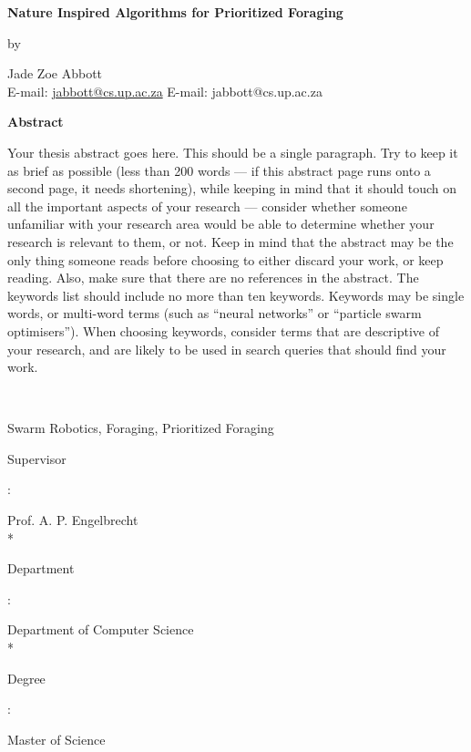 
\newpage

\begin{center}
	{\large\bf Nature Inspired Algorithms for Prioritized Foraging}
\end{center}
\begin{center}by\end{center}
\begin{center}
	{Jade Zoe Abbott}\\
	\ifpdf
		E-mail: \href{mailto:jabbott@cs.up.ac.za}{jabbott@cs.up.ac.za}
	\else
		E-mail: jabbott@cs.up.ac.za
	\fi
\end{center}
\vspace{1cm}
\begin{center}{\large\bf Abstract}\end{center}
Your thesis abstract goes here. This should be a single paragraph. Try to keep it as brief as possible (less than 200 words --- if this abstract page runs onto a second page, it needs shortening), while keeping in mind that it should touch on all the important aspects of your research --- consider whether someone unfamiliar with your research area would be able to determine whether your research is relevant to them, or not. Keep in mind that the abstract may be the only thing someone reads before choosing to either discard your work, or keep reading. Also, make sure that there are no references in the abstract. The keywords list should include no more than ten keywords. Keywords may be single words, or multi-word terms (such as ``neural networks'' or ``particle swarm optimisers''). When choosing keywords, consider terms that are descriptive of your research, and are likely to be used in search queries that should find your work.

\noindent\

 Swarm Robotics, Foraging, Prioritized Foraging

\vfill
\noindent
{\bf\parbox{26.8mm}{Supervisor}:} Prof. A. P. Engelbrecht \\* %
{\bf\parbox{26.8mm}{Department}:} Department of Computer Science \\*
{\bf\parbox{26.8mm}{Degree}:} Master of Science


\newpage

\ 

